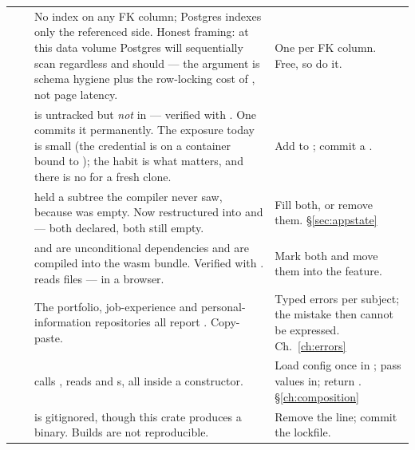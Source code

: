 \begin{longtable}{@{}p{}p{}L{0.375\textwidth}L{0.40\textwidth}@{}}
 &  & No index on any FK column; Postgres indexes only the referenced
side. Honest framing: at this data volume Postgres will sequentially scan regardless and should ---
the argument is schema hygiene plus the row-locking cost of , not page
latency. & One  per FK column. Free, so do it. \\

 &  &  is untracked but \emph{not} in  ---
verified with . One  commits it permanently. The exposure
today is small (the credential is  on a container bound to
); the habit is what matters, and there is no  for a fresh
clone. & Add  to ; commit a . \\

 &  &  held a  subtree the
compiler never saw, because  was empty. Now restructured into  and
 --- both declared, both still empty. & Fill both, or remove them.
\S\ref{sec:appstate} \\

 &  &  and  are unconditional dependencies and
are compiled into the wasm bundle. Verified with .  reads
 files --- in a browser. & Mark both  and move them into the 
feature. \\

 &  & The portfolio, job-experience and personal-information repositories
all report . Copy-paste. & Typed errors per subject; the
mistake then cannot be expressed. Ch.~\ref{ch:errors} \\

 &  &  calls , reads
 and s, all inside a constructor. & Load config once in ;
pass values in; return . \S\ref{ch:composition} \\

 &  &  is gitignored, though this crate produces a
binary. Builds are not reproducible. & Remove the  line; commit the lockfile. \\


\end{longtable}
